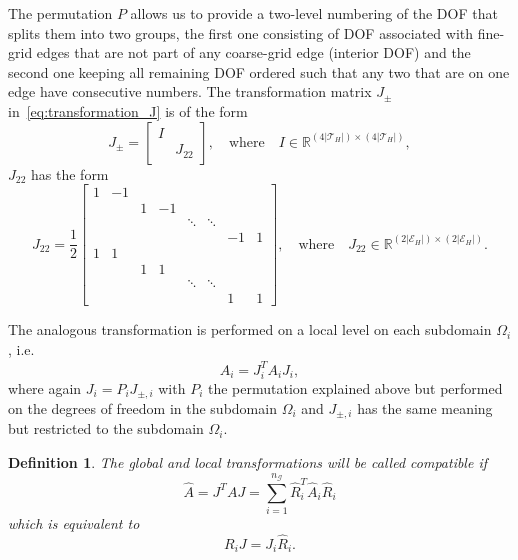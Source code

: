 \documentclass[11pt]{amsart}
\numberwithin{equation}{section}
\newtheorem{definition}{Definition}[section]
\theoremstyle{definition}\newtheorem{example}{Example}[section]
\begin{document}
The permutation $P$ allows us to provide 
a two-level numbering of the DOF that splits them into two groups, 
the first one consisting of DOF associated with fine-grid edges that are not part of 
any coarse-grid  edge 
(interior DOF) and the second one keeping all remaining DOF ordered such that any two that are 
on one edge have consecutive numbers. The transformation matrix $J_{\pm}$ in~\eqref{eq:transformation_J} 
is of the form
$$
J_{\pm}=\left[\begin{array}{cc}
    I& \\
    & J_{22}
    \end{array}\right],
\quad \mbox{where} \quad I \in {\mathbb{R}}^{(4 |{\mathcal{T}_H}|) \times (4 |{\mathcal{T}_H}|)},
$$
 $J_{22}$  has the form 
$$
J_{22}=\frac12 \left[\begin{array}{cccccccc}
    1 & -1 & & & & & & \\
    &  &  1 & -1 & & & & \\
    & & & &  \ddots & \ddots & & \\
    & & & & & & -1 & 1 \\
    1 & 1 & & & & & & \\
    &  &  1 & 1 & & & & \\
    & & & &  \ddots & \ddots & & \\
    & & & & & & 1 & 1 
    \end{array}\right],
\quad \mbox{where} \quad J_{22} \in {\mathbb{R}}^{(2|{\mathcal{E}_H}|) \times (2 |{\mathcal{E}_H}|)}.
$$

The analogous transformation is performed on a local level on each subdomain $\Omega_i$, i.e.
\begin{equation}\label{eq:A_i_hat}
\widehat{A}_i=J^T_i A_i J_i,
\end{equation} 
where again $J_i=P_i J_{\pm,i}$ with $P_i$ the permutation explained above but performed
on the degrees of freedom in the subdomain $\Omega_i$ and $ J_{\pm,i}$ has the 
same meaning but restricted to the subdomain $\Omega_i$. 

\begin{definition}
The global and local transformations will be called {\it compatible} if  
\begin{equation}\label{eq:compatibility1}
 \widehat{A}=J^T A J = \sum_{i=1}^{n_{\mathcal G}} \widehat{R}_i^T \widehat{A}_i \widehat{R}_i
\end{equation}
which is equivalent to 
\begin{equation}\label{eq:compatibility2}
 R_i J=J_i \widehat{R}_i.
\end{equation}
\end{definition}
\end{document}
